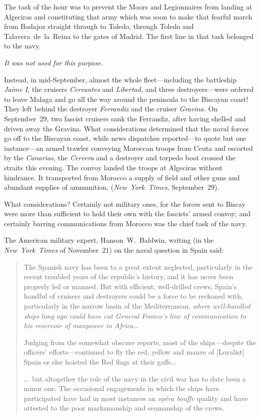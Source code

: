 The task of the hour was to prevent the Moors and Legionnaires from landing at Algeciras and constituting that army which was soon to make that fearful march from Badajoz straight through to Toledo, through Toledo and Talavera~de~la~Reina to the gates of Madrid. The first line in that task belonged to the navy.

\smallskip

\emph{It was not used for this purpose.}

\smallskip

Instead, in mid-September, almost the whole fleet---including the battleship \emph{Jaime I,} the cruisers \emph{Cervantes} and \emph{Libertad,} and three destroyers---were ordered to leave Malaga and go all the way around the peninsula to the Biscayan coast! They left behind the destroyer \emph{Ferrandiz} and the cruiser \emph{Gravina.} On September~29, two fascist cruisers sank the Ferrandiz, after having shelled and driven away the Gravina. What considerations determined that the naval forces go off to the Biscayan coast, while news dispatches reported---to quote but one instance---an armed trawler conveying Moroccan troops from Ceuta and escorted by the \emph{Canarias,} the \emph{Cervera} and a destroyer and torpedo boat crossed the straits this evening. The convoy landed the troops at Algeciras without hindrance. It transported from Morocco a supply of field and other guns and abundant supplies of ammunition. (\emph{New~York~Times,} September~29).

What considerations? Certainly not military ones, for the forces sent to Biscay were more than sufficient to hold their own with the fascists’ armed convoy; and certainly barring communications from Morocco was the chief task of the navy.

The American military expert, Hanson~W.~Baldwin, writing (in the \emph{New~York~Times} of November~21) on the naval question in Spain said:

\indexNYT{}
\begin{quotation}
  The Spanish navy has been to a great extent neglected, particularly in the recent troubled years of the republic’s history, and it has never been properly led or manned. But with efficient, well-drilled crews, Spain’s handful of cruisers and destroyers could be a force to be reckoned with, particularly in the narrow basin of the Mediterranean, \emph{where well-handled ships long ago could have cut General Franco’s line of communication to his reservoir of manpower in Africa\dots}
  
  Judging from the somewhat obscure reports, most of the ships---despite the officers’ efforts---continued to fly the red, yellow and mauve of [Loyalist] Spain or else hoisted the Red flags at their gaffs\dots
  
  \dots\ but altogether the role of the navy in the civil war has to date been a minor one. The occasional engagements in which the ships have participated have had in most instances an \emph{op\'era bouffe} quality and have attested to the poor marksmanship and seamanship of the crews.
\end{quotation}

